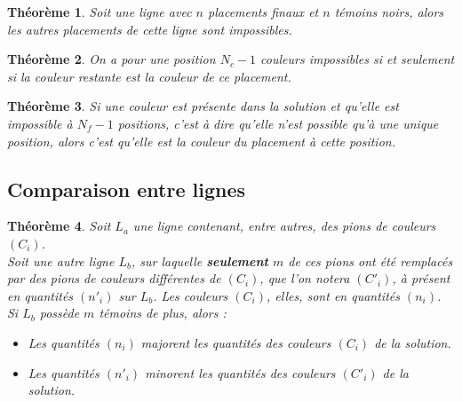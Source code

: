\documentclass[]{article}
\newtheorem{mythm}{Théorème}
\begin{document}
\begin{mythm}
Soit une ligne avec $n$ placements finaux et $n$ témoins noirs, alors les autres placements de cette ligne sont impossibles.
\end{mythm}

\begin{mythm}
On a pour une position $N_c-1$ couleurs impossibles si et seulement si la couleur restante est la couleur de ce placement.
\end{mythm}

\begin{mythm}
Si une couleur est présente dans la solution et qu'elle est impossible à $N_f-1$ positions, c'est à dire qu'elle n'est possible qu'à une unique position, alors c'est qu'elle est la couleur du placement à cette position.
\end{mythm}

\subsection{Comparaison entre lignes}

\begin{mythm}
Soit $L_a$ une ligne contenant, entre autres, des pions de couleurs $(C_i)$.
\\
Soit une autre ligne $L_b$, sur laquelle \textbf{seulement} $m$ de ces pions ont été remplacés par des pions de couleurs différentes de $(C_i)$, que l'on notera $(C'_i)$, à présent en quantités $(n'_i)$ sur $L_b$. Les couleurs $(C_i)$, elles, sont en quantités $(n_i)$.
\\Si $L_b$ possède $m$ témoins de plus, alors :
\begin{itemize}
	\item Les quantités $(n_i)$ majorent les quantités des couleurs $(C_i)$ de la solution.
	\item Les quantités $(n'_i)$ minorent les quantités des couleurs $(C'_i)$ de la solution.
\end{itemize}
\end{mythm}
\end{document}
